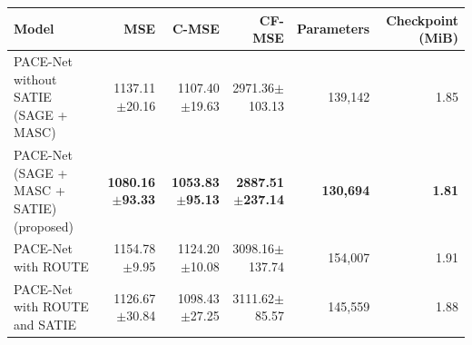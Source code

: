 \begin{tabular}{p{6.6cm}rrrrr}
\toprule
Model & MSE & C-MSE & CF-MSE & Parameters & Checkpoint (MiB)\\
\midrule
PACE-Net without SATIE (SAGE + MASC) & 1137.11$\pm$20.16 & 1107.40$\pm$19.63 & 2971.36$\pm$103.13 & 139,142 & 1.85\\
PACE-Net (SAGE + MASC + SATIE) (proposed) & \textbf{1080.16$\pm$93.33} & \textbf{1053.83$\pm$95.13} & \textbf{2887.51$\pm$237.14} & \textbf{130,694} & \textbf{1.81}\\
PACE-Net with ROUTE & 1154.78$\pm$9.95 & 1124.20$\pm$10.08 & 3098.16$\pm$137.74 & 154,007 & 1.91\\
PACE-Net with ROUTE and SATIE & 1126.67$\pm$30.84 & 1098.43$\pm$27.25 & 3111.62$\pm$85.57 & 145,559 & 1.88\\
\bottomrule
\end{tabular}
